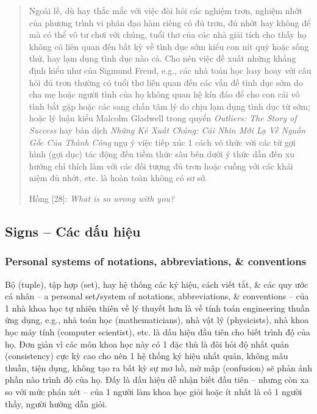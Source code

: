 \documentclass[12pt]{article}
\begin{document}
\begin{quote}
	Ngoài lề, dù hay thắc mắc với việc đòi hỏi các nghiệm trơn, nghiệm nhớt của phương trình vi phân đạo hàm riêng có đủ trơn, đủ nhớt hay không để mà có thể vô tư chơi với chúng, tuổi thơ của các nhà giải tích cho thấy họ không có liên quan đến bất kỳ về tình dục sớm kiểu con nít quỷ hoặc sống thử, hay lạm dụng tình dục nào cả. Cho nên việc đề xuất những khẳng định kiểu như của {\sc Sigmund Freud}, e.g., các nhà toán học loay hoay với câu hỏi đủ trơn thường có tuổi thơ liên quan đến các vấn đề tình dục sớm do cha mẹ hoặc người tình của họ không quan hệ kín đáo để cho con cái vô tình bắt gặp hoặc các sang chấn tâm lý do chịu lạm dụng tình dục từ sớm; hoặc lý luận kiểu {\sc Malcolm Gladwell} trong quyển {\it Outliers: The Story of Success} \cite{Gladwell2008} hay bản dịch {\it Những Kẻ Xuất Chúng: Cái Nhìn Mới Lạ Về Nguồn Gốc Của Thành Công} \cite{Gladwell_outlier} ngụ ý việc tiếp xúc 1 cách vô thức với các từ gợi hình (gợi dục) tác động đến tiềm thức sâu bên dưới ý thức dẫn đến xu hướng chỉ thích làm với các đối tượng đủ trơn hoặc cuồng với các khái niệm đủ nhớt, etc. là hoàn toàn không có sơ sở.
	
	{\sf Hồng [28]}: {\it What is so wrong with you?}
\end{quote}

\subsection{Signs -- Các dấu hiệu}

\subsubsection{Personal systems of notations, abbreviations, \& conventions}
Bộ (tuple), tập hợp (set), hay hệ thống các ký hiệu, cách viết tắt, \& các quy ước cá nhân -- a personal set{\tt/}system of notations, abbreviations, \& conventions -- của 1 nhà khoa học tự nhiên thiên về lý thuyết hơn là về tính toán engineering thuần ứng dụng, e.g., nhà toán học (mathematicians), nhà vật lý (physicists), nhà khoa học máy tính (computer scientist), etc. là dấu hiệu đầu tiên cho biết trình độ của họ. Đơn giản vì các môn khoa học này có 1 đặc thù là đòi hỏi độ nhất quán (consistency) cực kỳ cao cho nên 1 hệ thống ký hiệu nhất quán, không mâu thuẫn, tiện dụng, không tạo ra bất kỳ sự mơ hồ, mờ mập (confusion) sẽ phản ánh phần nào trình độ của họ. Đấy là dấu hiệu dễ nhận biết đầu tiên -- nhưng còn xa so với mức phán xét -- của 1 người làm khoa học giỏi hoặc ít nhất là có 1 người thầy, người hướng dẫn giỏi.
\end{document}
